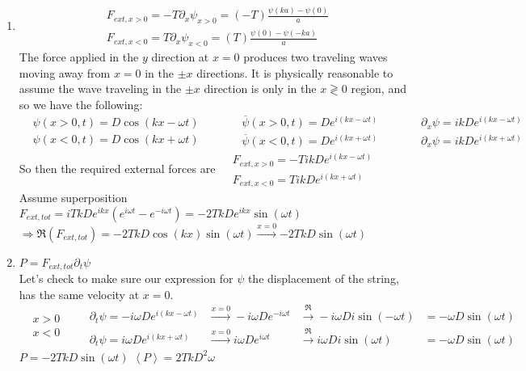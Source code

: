 \documentclass[twoside,10pt]{amsart}
\newcommand{\problemhead}[1]
  {\smallskip
   \noindent{\large\bf Problem #1.}
   \smallskip}
\begin{document}
\problemhead{8.1} \begin{enumerate}
\item \[
  \begin{aligned}
    & F_{ext, x > 0 } = -T \partial_x \psi_{x>0} = (-T) \frac{ \psi(ka) - \psi(0)}{ a } \\
    & F_{ext, x < 0 } = T \partial_x \psi_{x<0} = (T) \frac{ \psi(0) - \psi(-ka) }{ a }
  \end{aligned}
\]
The force applied in the $y$ direction at $x=0$ produces two traveling waves moving away from $x=0$ in the $\pm x$ directions.  It is physically reasonable to assume the wave traveling in the $\pm x$ direction is only in the $x\gtrless 0$ region, and so we have the following:
\[
\begin{aligned}
  & \psi(x > 0 ,t ) = D \cos{ (kx -\omega t) } \\
  & \psi(x < 0 ,t ) = D \cos{ (kx +\omega t) }
\end{aligned} \quad \quad \, 
\begin{aligned}
  & \overline{\psi}(x > 0 ,t) = De^{ i(kx - \omega t) } \\
  & \overline{\psi}(x < 0, t) = De^{ i (kx + \omega t) }
\end{aligned} \quad \quad \, 
\begin{aligned}
  & \partial_x \psi = ik D e^{i (kx - \omega t) } \\
  & \partial_x \psi  = ik De^{i (kx + \omega t) } 
\end{aligned}
\]
So then the required external forces are $\begin{aligned} 
  & F_{ext, x> 0 } = -T i k D e^{i (kx - \omega t ) } \\
  & F_{ext, x < 0 } = T i k De^{i (kx + \omega t) }
\end{aligned}$ \medskip  \\
Assume superposition $F_{ext,tot} = i Tk De^{ikx}(e^{i\omega t } - e^{-i \omega t} ) = -2T k De^{ikx} \sin{ (\omega t) }$ \medskip \\
$\Longrightarrow \Re{ (F_{ext, tot} ) } = -2 Tk D \cos{(kx)} \sin{(\omega t) } \xrightarrow{x=0} \boxed{ -2 TkD \sin{ (\omega t) } }$
\item $P = F_{ext,tot} \partial_t \psi$ \bigskip \\
Let's check to make sure our expression for $\psi$ the displacement of the string, has the same velocity at $x=0$.  
\[
\begin{aligned}
  & x > 0 \\
  & x < 0 
\end{aligned} \quad 
\begin{aligned}
  & \partial_t \psi = - i \omega De^{i (kx -\omega t) } & \xrightarrow{x=0} - i \omega De^{ -i \omega t} & \xrightarrow{ \Re} -i \omega D i \sin{ (-\omega t)} & = - \omega D \sin{ (\omega t) } \\
  & \partial_t \psi = i \omega De^{ i (kx + \omega t) } & \xrightarrow{x=0} i \omega De^{ i\omega t} & \xrightarrow{ \Re } i \omega D i \sin{ (\omega t) } & = - \omega D \sin{(\omega t) }
\end{aligned}
\]
$P = -2TkD \sin{ (\omega t) }$ \quad \quad $\boxed{ \left< P \right> = 2 TkD^2 \omega }$ 
\end{enumerate}
\end{document}
